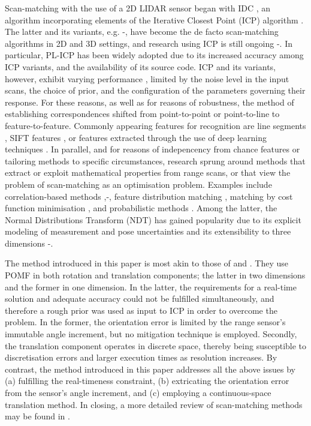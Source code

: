 Scan-matching with the use of a 2D LIDAR sensor began with IDC \cite{LuMilios},
an algorithm incorporating elements of the Iterative Closest Point (ICP)
algorithm \cite{ICP}. The latter and its variants, e.g.
\cite{weighted}-\cite{plicp}, have become the de facto scan-matching algorithms
in 2D and 3D settings, and research using ICP is still ongoing
\cite{ICP_var_1}-\cite{Marchel}. In particular, PL-ICP \cite{plicp} has been
widely adopted due to its increased accuracy among ICP variants, and the
availability of its source code. ICP and its variants, however, exhibit varying
performance \cite{icp_comp_trade}, limited by the noise level in the input
scans, the choice of prior, and the configuration of the parameters
governing their response. For these reasons, as well as for reasons of
robustness, the method of establishing correspondences shifted from
point-to-point or point-to-line to feature-to-feature. Commonly appearing
features for recognition are line segments \cite{CLS}\cite{Haytham}\cite{Wen},
SIFT features \cite{Jiayuan}, or features extracted through the use of deep
learning techniques \cite{Jiaxin}. In parallel, and for reasons of
indepencency from chance features or tailoring methods to specific
circumstances, research sprung around methods that extract or exploit
mathematical properties from range scans, or that view the problem of
scan-matching as an optimisation problem. Examples include correlation-based
methods \cite{olson},\cite{olson_2015}-\cite{Konecny}, feature distribution
matching \cite{HSM}, matching by cost function minimisation \cite{PB_PSM}, and
probabilistic methods \cite{pIC}\cite{gpm}. Among the latter, the Normal
Distributions Transform (NDT) \cite{ndt1} has gained popularity due to its
explicit modeling of measurement and pose uncertainties and its extensibility
to three dimensions \cite{ndt2}-\cite{ndt6}.

The method introduced in this paper is most akin to those of \cite{Heng} and
\cite{Jiang}. They use POMF \cite{fmt2d} in both rotation and translation
components; the latter in two dimensions and the former in one dimension. In
the latter, the requirements for a real-time solution and adequate accuracy
could not be fulfilled simultaneously, and therefore a rough prior was used
as input to ICP in order to overcome the problem. In the former, the orientation
error is limited by the range sensor's immutable angle increment, but no
mitigation technique is employed. Secondly, the translation component operates
in discrete space, thereby being susceptible to discretisation errors and
larger execution times as resolution increases. By contrast, the method
introduced in this paper addresses all the above issues by (a) fulfilling the
real-timeness constraint, (b) extricating the orientation error from the
sensor's angle increment, and (c) employing a continuous-space translation
method. In closing, a more detailed review of scan-matching methods may be
found in \cite{pose_selection}.
